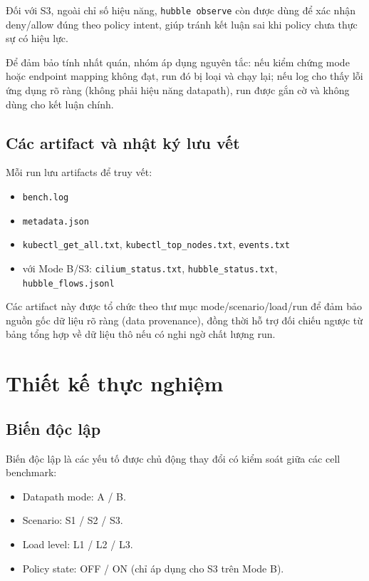 Đối với S3, ngoài chỉ số hiệu năng, \texttt{hubble observe} còn được dùng để xác nhận deny/allow đúng theo policy intent, giúp tránh kết luận sai khi policy chưa thực sự có hiệu lực.

Để đảm bảo tính nhất quán, nhóm áp dụng nguyên tắc: nếu kiểm chứng mode hoặc endpoint mapping không đạt, run đó bị loại và chạy lại; nếu log cho thấy lỗi ứng dụng rõ ràng (không phải hiệu năng datapath), run được gắn cờ và không dùng cho kết luận chính.

\subsection{Các artifact và nhật ký lưu vết}
Mỗi run lưu artifacts để truy vết:
\begin{itemize}
  \item \texttt{bench.log}
  \item \texttt{metadata.json}
  \item \texttt{kubectl\_get\_all.txt}, \texttt{kubectl\_top\_nodes.txt}, \texttt{events.txt}
  \item với Mode B/S3: \texttt{cilium\_status.txt}, \texttt{hubble\_status.txt}, \texttt{hubble\_flows.jsonl}
\end{itemize}

Các artifact này được tổ chức theo thư mục mode/scenario/load/run để đảm bảo nguồn gốc dữ liệu rõ ràng (data provenance), đồng thời hỗ trợ đối chiếu ngược từ bảng tổng hợp về dữ liệu thô nếu có nghi ngờ chất lượng run.

\section{Thiết kế thực nghiệm}
\label{sec:experimental-design}

\subsection{Biến độc lập}
Biến độc lập là các yếu tố được chủ động thay đổi có kiểm soát giữa các cell benchmark:
\begin{itemize}
  \item Datapath mode: A / B.
  \item Scenario: S1 / S2 / S3.
  \item Load level: L1 / L2 / L3.
  \item Policy state: OFF / ON (chỉ áp dụng cho S3 trên Mode B).
\end{itemize}

